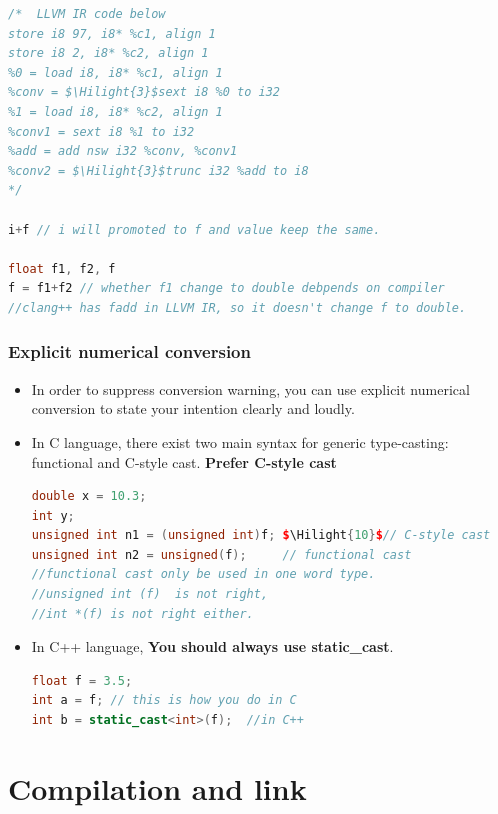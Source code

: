 \documentclass[a4paper,12pt,twoside]{book}
\newcommand{\Hilight}[1]{\makebox[0pt][l]{\color{yellow}\rule[-3pt]{#1em}{11pt}}}
\begin{document}
\begin{itemize}
\begin{lstlisting}[frame=single, language=c++, mathescape=true]
/*  LLVM IR code below
store i8 97, i8* %c1, align 1
store i8 2, i8* %c2, align 1
%0 = load i8, i8* %c1, align 1
%conv = $\Hilight{3}$sext i8 %0 to i32
%1 = load i8, i8* %c2, align 1
%conv1 = sext i8 %1 to i32
%add = add nsw i32 %conv, %conv1
%conv2 = $\Hilight{3}$trunc i32 %add to i8
*/

i+f // i will promoted to f and value keep the same.

float f1, f2, f
f = f1+f2 // whether f1 change to double debpends on compiler
//clang++ has fadd in LLVM IR, so it doesn't change f to double.
\end{lstlisting}
\end{itemize}

\subsubsection{Explicit numerical conversion}
\begin{itemize}
	\item In order to suppress conversion warning, you can use explicit numerical conversion to state your intention clearly and loudly.
	
	\item In C language, there exist two main syntax for generic type-casting: functional and C-style cast.  \textbf{Prefer C-style cast}
	
\begin{lstlisting}[frame=single, language=c++, mathescape=true]
double x = 10.3;
int y;
unsigned int n1 = (unsigned int)f; $\Hilight{10}$// C-style cast
unsigned int n2 = unsigned(f);     // functional cast
//functional cast only be used in one word type.
//unsigned int (f)  is not right,
//int *(f) is not right either.
\end{lstlisting}
	
	\item In C++ language, \textbf{You should always use static\_cast}. 
	
\begin{lstlisting}[frame=single, language=c++, mathescape=true]
float f = 3.5; 
int a = f; // this is how you do in C 
int b = static_cast<int>(f);  //in C++
\end{lstlisting}
\end{itemize}


\section{Compilation and link}
\end{document}

